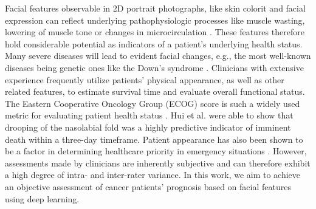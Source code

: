 \documentclass[runningheads]{llncs}
\begin{document}
Facial features observable in 2D portrait photographs, like skin colorit and facial expression can reflect underlying pathophysiologic processes like muscle wasting, lowering of muscle tone or changes in microcirculation \cite{oken1982toxicity}. These features therefore hold considerable potential as indicators of a patient's underlying health status.
Many severe diseases will lead to evident facial changes, e.g., the most well-known diseases being genetic ones like the Down's syndrome \cite{gurovich2019identifying}. 
Clinicians with extensive experience frequently utilize patients' physical appearance, as well as other related features, to estimate survival time and evaluate overall functional status. The Eastern Cooperative Oncology Group (ECOG) score is such a widely used metric for evaluating patient health status \cite{oken1982toxicity}. 
Hui et al. \cite{hui2015diagnostic} were able to show that drooping of the nasolabial fold  was a highly predictive indicator of imminent death within a three-day timeframe.
Patient appearance has also been shown to be a factor in determining healthcare priority in emergency situations \cite{bagnis2020judging}. However, assessments made by clinicians are inherently subjective and can therefore exhibit a high degree of intra- and inter-rater variance. In this work, we aim to achieve an objective assessment of cancer patients' prognosis based on facial features using deep learning.
 
\end{document}
